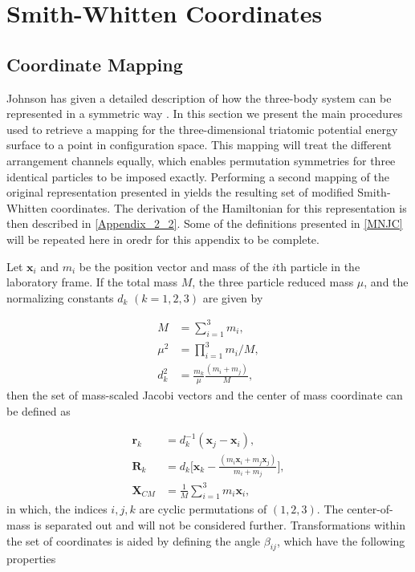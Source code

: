 \chapter{Smith-Whitten Coordinates}\label{smith}
\section{Coordinate Mapping}\label{Appendix_2_1}
Johnson has given a detailed description of how the three-body system can be represented in a symmetric way \cite{Johnson1980}. In this section we present the main procedures used to retrieve a mapping for the three-dimensional triatomic potential energy surface to a point in configuration space. This mapping will treat the different arrangement channels equally, which enables permutation symmetries for three identical particles to be imposed exactly. Performing a second mapping of the original representation presented in \cite{Smith1962,Smith_Whitten1968} yields the resulting set of modified Smith-Whitten coordinates. The derivation of the Hamiltonian for this representation is then described in \cref{Appendix_2_2}. Some of the definitions presented in \cref{MNJC} will be repeated here in oredr for this appendix to be complete.

Let $\mathbf{x}_i$ and $m_{i}$ be the position vector and mass of the $i$th particle in the laboratory frame. If the total mass $M$, the three particle reduced mass $\mu$, and the normalizing constants $d_{k}$ $(k=1,2,3)$ are given by

\begin{align}
M &= \sum_{i=1}^{3}m_i, \\
\mu^2 &= \prod_{i=1}^{3}m_i/M,\\
d_k^2 &= \frac{m_k}{\mu}\frac{(m_i+m_j)}{M},
\end{align}
then the set of mass-scaled Jacobi vectors and the center of mass coordinate can be defined as

\begin{align}
\mathbf{r}_k &= d^{-1}_k(\mathbf{x}_{j}-\mathbf{x}_{i}), \\
\mathbf{R}_k &= d_k\Big[\mathbf{x}_{k}-\frac{(m_{i}\mathbf{x}_{i}+m_{j}\mathbf{x}_{j})}{m_{i}+m_{j}}\Big],\\
\mathbf{X}_{CM} &= \frac{1}{M} \sum_{i=1}^{3} m_{i} \mathbf{x}_{i},
\end{align}   
in which, the indices $i,j,k$ are cyclic permutations of $(1,2,3)$. The center-of-mass is separated out and will not be considered further. Transformations within the set of coordinates is aided by defining the angle $\beta_{ij}$, which have the following properties

